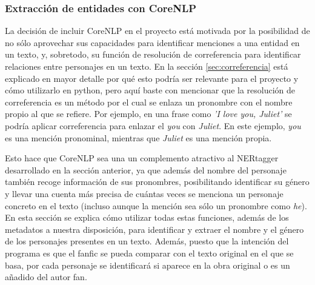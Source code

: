 \documentclass{pre-tfg}
\begin{document}

\subsubsection{Extracción de entidades con CoreNLP}
\label{sec:nerextract_corenlp}
La decisión de incluir CoreNLP en el proyecto está motivada por la posibilidad de no sólo aprovechar sus capacidades para identificar menciones a una entidad en un texto, y, sobretodo, su función de resolución de correferencia para identificar relaciones entre personajes en un texto. En la sección \ref{sec:correferencia} está explicado en mayor detalle por qué esto podría ser relevante para el proyecto y cómo utilizarlo en python, pero aquí baste con mencionar que la resolución de correferencia es un método por el cual se enlaza un pronombre con el nombre propio al que se refiere. Por ejemplo, en una frase como \textit{'I love you, Juliet'} se podría aplicar correferencia para enlazar el \textit{you} con \textit{Juliet}. En este ejemplo, \textit{you} es una mención pronominal, mientras que \textit{Juliet} es una mención propia.

Esto hace que CoreNLP sea una un complemento atractivo al NERtagger desarrollado en la sección anterior, ya que además del nombre del personaje también recoge información de sus pronombres, posibilitando identificar su género y llevar una cuenta más precisa de cuántas veces se menciona un personaje concreto en el texto (incluso aunque la mención sea sólo un pronombre como \textit{he}). En esta sección se explica cómo utilizar todas estas funciones, además de los metadatos a nuestra disposición, para identificar y extraer el nombre y el género de los personajes presentes en un texto. Además, puesto que la intención del programa es que el fanfic se pueda comparar con el texto original en el que se basa, por cada personaje se identificará si aparece en la obra original o es un añadido del autor fan.
\end{document}
